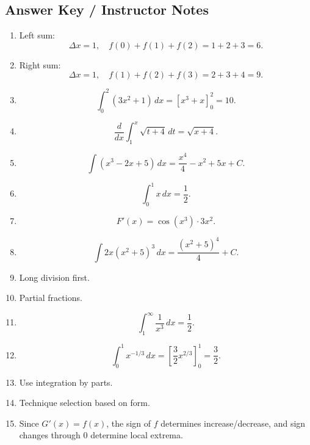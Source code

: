 \documentclass[11pt]{article}
\begin{document}
\newpage
\subsection{Answer Key / Instructor Notes}

\begin{enumerate}
    \item Left sum:
    \[
    \Delta x=1,\quad f(0)+f(1)+f(2)=1+2+3=6.
    \]

    \item Right sum:
    \[
    \Delta x=1,\quad f(1)+f(2)+f(3)=2+3+4=9.
    \]

    \item
    \[
    \int_0^2 (3x^2+1)\,dx=[x^3+x]_0^2=10.
    \]

    \item
    \[
    \frac{d}{dx}\int_1^x \sqrt{t+4}\,dt=\sqrt{x+4}.
    \]

    \item
    \[
    \int (x^3-2x+5)\,dx=\frac{x^4}{4}-x^2+5x+C.
    \]

    \item
    \[
    \int_0^1 x\,dx=\frac12.
    \]

    \item
    \[
    F'(x)=\cos(x^3)\cdot 3x^2.
    \]

    \item
    \[
    \int 2x(x^2+5)^3\,dx=\frac{(x^2+5)^4}{4}+C.
    \]

    \item Long division first.

    \item Partial fractions.

    \item
    \[
    \int_1^\infty \frac{1}{x^3}\,dx=\frac12.
    \]

    \item
    \[
    \int_0^1 x^{-1/3}\,dx=\left[\frac{3}{2}x^{2/3}\right]_0^1=\frac32.
    \]

    \item Use integration by parts.

    \item Technique selection based on form.

    \item Since \(G'(x)=f(x)\), the sign of \(f\) determines increase/decrease, and sign changes through \(0\) determine local extrema.
\end{enumerate}
\end{document}
